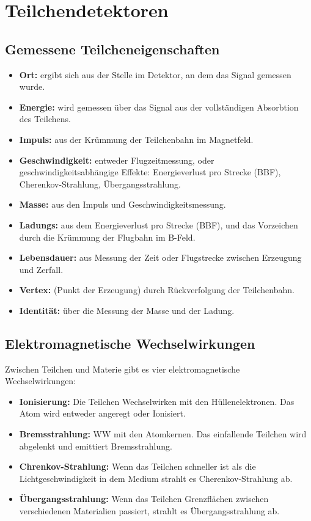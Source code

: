 \documentclass[final]{summery_5.0}
\begin{document}
\section{Teilchendetektoren}

\subsection{Gemessene Teilcheneigenschaften}
\begin{itemize}
    \item {\bf Ort:} ergibt sich aus der Stelle im Detektor, an dem das Signal gemessen wurde.
    \item {\bf Energie:} wird gemessen über das Signal aus der vollständigen Absorbtion des Teilchens. 
    \item {\bf Impuls:} aus der Krümmung der Teilchenbahn im Magnetfeld.
    \item {\bf Geschwindigkeit:} entweder Flugzeitmessung, oder geschwindigkeitsabhängige Effekte: Energieverlust pro Strecke (BBF), Cherenkov-Strahlung, Übergangsstrahlung.
    \item {\bf Masse:} aus den Impuls und Geschwindigkeitsmessung.
    \item {\bf Ladungs:} aus dem Energieverlust pro Strecke (BBF), und das Vorzeichen durch die Krümmung der Flugbahn im B-Feld.
    \item {\bf Lebensdauer:} aus Messung der Zeit oder Flugstrecke zwischen Erzeugung und Zerfall.
    \item {\bf Vertex:} (Punkt der Erzeugung) durch Rückverfolgung der Teilchenbahn.
    \item {\bf Identität:} über die Messung der Masse und der Ladung.
\end{itemize}

\subsection{Elektromagnetische Wechselwirkungen}
    Zwischen Teilchen und Materie gibt es vier elektromagnetische Wechselwirkungen:
\begin{itemize}
    \item {\bf Ionisierung:} Die Teilchen Wechselwirken mit den Hüllenelektronen. Das Atom wird entweder angeregt oder Ionisiert.
    \item {\bf Bremsstrahlung:} WW mit den Atomkernen. Das einfallende Teilchen wird abgelenkt und emittiert Bremsstrahlung.
    \item {\bf Chrenkov-Strahlung:} Wenn das Teilchen schneller ist als die Lichtgeschwindigkeit in dem Medium strahlt es Cherenkov-Strahlung ab.
    \item {\bf Übergangsstrahlung:} Wenn das Teilchen Grenzflächen zwischen verschiedenen Materialien passiert, strahlt es Übergangsstrahlung ab. 
\end{itemize}
\end{document}
